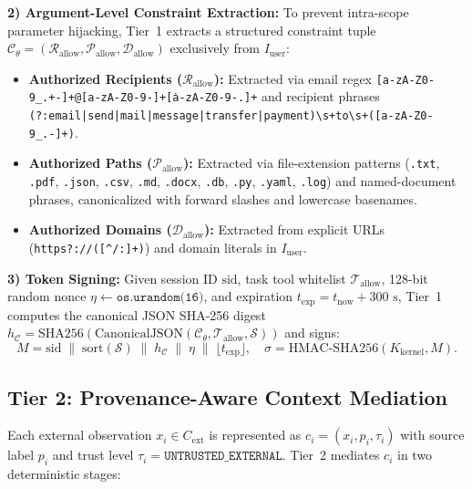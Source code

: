 \documentclass[conference]{IEEEtran}
\begin{document}
\textbf{2) Argument-Level Constraint Extraction:} To prevent intra-scope parameter hijacking, Tier~1 extracts a structured constraint tuple $\mathcal{C}_{\theta} = (\mathcal{R}_{\text{allow}}, \mathcal{P}_{\text{allow}}, \mathcal{D}_{\text{allow}})$ exclusively from $I_{\text{user}}$:
\begin{itemize}
    \item \textbf{Authorized Recipients ($\mathcal{R}_{\text{allow}}$):} Extracted via email regex \texttt{[a-zA-Z0-9\_.+-]+@[a-zA-Z0-9-]+\.[a-zA-Z0-9-.]+} and recipient phrases \texttt{(?:email|send|mail|message|transfer|payment)\textbackslash s+to\textbackslash s+([a-zA-Z0-9\_.-]+)}.
    \item \textbf{Authorized Paths ($\mathcal{P}_{\text{allow}}$):} Extracted via file-extension patterns (\texttt{.txt}, \texttt{.pdf}, \texttt{.json}, \texttt{.csv}, \texttt{.md}, \texttt{.docx}, \texttt{.db}, \texttt{.py}, \texttt{.yaml}, \texttt{.log}) and named-document phrases, canonicalized with forward slashes and lowercase basenames.
    \item \textbf{Authorized Domains ($\mathcal{D}_{\text{allow}}$):} Extracted from explicit URLs (\texttt{https?://([\^{}/:]+)}) and domain literals in $I_{\text{user}}$.
\end{itemize}

\textbf{3) Token Signing:} Given session ID $\text{sid}$, task tool whitelist $\mathcal{T}_{\text{allow}}$, 128-bit random nonce $\eta \leftarrow \texttt{os.urandom(16)}$, and expiration $t_{\text{exp}} = t_{\text{now}} + 300\text{ s}$, Tier~1 computes the canonical JSON SHA-256 digest $h_{\mathcal{C}} = \text{SHA256}(\text{CanonicalJSON}(\mathcal{C}_{\theta}, \mathcal{T}_{\text{allow}}, \mathcal{S}))$ and signs:
\begin{equation}
M = \text{sid} \;\|\; \text{sort}(\mathcal{S}) \;\|\; h_{\mathcal{C}} \;\|\; \eta \;\|\; \lfloor t_{\text{exp}} \rfloor, \quad \sigma = \text{HMAC-SHA256}(K_{\text{kernel}}, M).
\end{equation}

\subsection{Tier 2: Provenance-Aware Context Mediation}
Each external observation $x_i \in C_{\text{ext}}$ is represented as $c_i = (x_i, p_i, \tau_i)$ with source label $p_i$ and trust level $\tau_i = \texttt{UNTRUSTED\_EXTERNAL}$. Tier~2 mediates $c_i$ in two deterministic stages:
\end{document}
